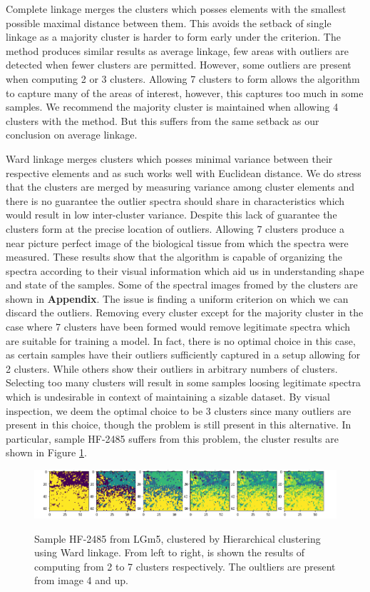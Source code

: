 Complete linkage merges the clusters which posses elements with the smallest possible maximal distance between them. This avoids the setback of single linkage as a majority cluster is harder to form early under the criterion. The method produces similar results as average linkage, few areas with outliers are detected when fewer clusters are permitted. However, some outliers are present when computing 2 or 3 clusters. Allowing 7 clusters to form allows the algorithm to capture many of the areas of interest, however, this captures too much in some samples. We recommend the majority cluster is maintained when allowing 4 clusters with the method. But this suffers from the same setback as our conclusion on average linkage.

Ward linkage merges clusters which posses minimal variance between their respective elements and as such works well with Euclidean distance. We do stress that the clusters are merged by measuring variance among cluster elements and there is no guarantee the outlier spectra should share in characteristics which would result in low inter-cluster variance. Despite this lack of guarantee the clusters form at the precise location of outliers. Allowing 7 clusters produce a near picture perfect image of the biological tissue from which the spectra were measured. These results show that the algorithm is capable of organizing the spectra according to their visual information which aid us in understanding shape and state of the samples. Some of the spectral images fromed by the clusters are shown in \textbf{Appendix}. The issue is finding a uniform criterion on which we can discard the outliers. Removing every cluster except for the majority cluster in the case where 7 clusters have been formed would remove legitimate spectra which are suitable for training a model. In fact, there is no optimal choice in this case, as certain samples have their outliers sufficiently captured in a setup allowing for 2 clusters. While others show their outliers in arbitrary numbers of clusters. Selecting too many clusters will result in some samples loosing legitimate spectra which is undesirable in context of maintaining a sizable dataset. By visual inspection, we deem the optimal choice to be 3 clusters since many outliers are present in this choice, though the problem is still present in this alternative. In particular, sample HF-2485 suffers from this problem, the cluster results are shown in Figure \ref{fig:hf_2485}.

\begin{figure}[h]

    \centering
{\includegraphics[width=15cm]{images/Ward_linkage/LGm-5/HF-2485_V1B_1.h5_9.png} }
\caption{Sample HF-2485 from LGm5, clustered by Hierarchical clustering using Ward linkage. From left to right, is shown the results of computing from 2 to 7 clusters respectively. The oultliers are present from image 4 and up.
\label{fig:hf_2485}}%
\end{figure}

